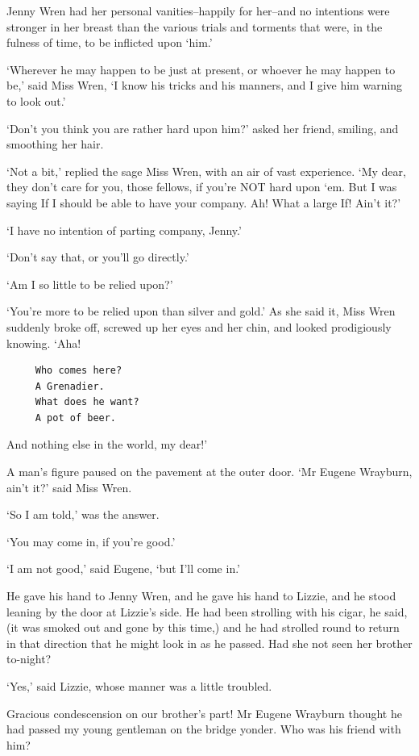 Jenny Wren had her personal vanities--happily for her--and no intentions
were stronger in her breast than the various trials and torments that
were, in the fulness of time, to be inflicted upon ‘him.’

‘Wherever he may happen to be just at present, or whoever he may happen
to be,’ said Miss Wren, ‘I know his tricks and his manners, and I give
him warning to look out.’

‘Don’t you think you are rather hard upon him?’ asked her friend,
smiling, and smoothing her hair.

‘Not a bit,’ replied the sage Miss Wren, with an air of vast experience.
‘My dear, they don’t care for you, those fellows, if you’re NOT hard
upon ‘em. But I was saying If I should be able to have your company. Ah!
What a large If! Ain’t it?’

‘I have no intention of parting company, Jenny.’

‘Don’t say that, or you’ll go directly.’

‘Am I so little to be relied upon?’

‘You’re more to be relied upon than silver and gold.’ As she said it,
Miss Wren suddenly broke off, screwed up her eyes and her chin, and
looked prodigiously knowing. ‘Aha!

\begin{verbatim}
     Who comes here?
     A Grenadier.
     What does he want?
     A pot of beer.
\end{verbatim}

And nothing else in the world, my dear!’

A man’s figure paused on the pavement at the outer door. ‘Mr Eugene
Wrayburn, ain’t it?’ said Miss Wren.

‘So I am told,’ was the answer.

‘You may come in, if you’re good.’

‘I am not good,’ said Eugene, ‘but I’ll come in.’

He gave his hand to Jenny Wren, and he gave his hand to Lizzie, and he
stood leaning by the door at Lizzie’s side. He had been strolling with
his cigar, he said, (it was smoked out and gone by this time,) and he
had strolled round to return in that direction that he might look in as
he passed. Had she not seen her brother to-night?

‘Yes,’ said Lizzie, whose manner was a little troubled.

Gracious condescension on our brother’s part! Mr Eugene Wrayburn thought
he had passed my young gentleman on the bridge yonder. Who was his
friend with him?

